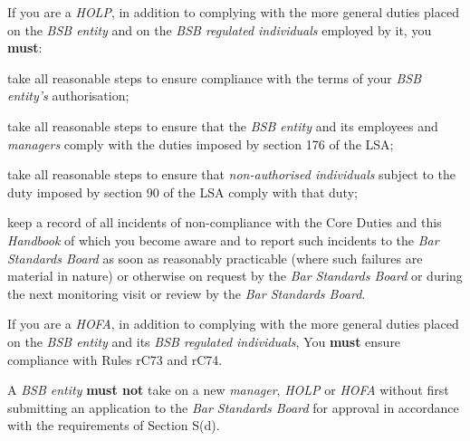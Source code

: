 


If you are a \emph{HOLP}, in addition to complying with the more general
duties placed on the \emph{BSB entity} and on the \emph{BSB regulated
individuals} employed by it, you \textcolor{myred}{\textbf{must}}:
\begin{numlist}
\item take all reasonable steps to ensure compliance with the terms of your
\emph{BSB entity's} authorisation;

\item take all reasonable steps to ensure that the \emph{BSB entity} and
its employees and \emph{managers} comply with the duties imposed by
section 176 of the LSA;

\item take all reasonable steps to ensure that \emph{non-authorised
individuals} subject to the duty imposed by section 90 of the LSA comply
with that duty;

\item keep a record of all incidents of non-compliance with the Core Duties
and this \emph{Handbook} of which you become aware and to report such
incidents to the \emph{Bar Standards Board} as soon as reasonably
practicable (where such failures are material in nature) or otherwise on
request by the \emph{Bar Standards Board} or during the next monitoring
visit or review by the \emph{Bar Standards Board}.
\end{numlist}

If you are a \emph{HOFA}, in addition to complying with the more general
duties placed on the \emph{BSB entity} and its \emph{BSB regulated
individuals}, You \textcolor{myred}{\textbf{must}} ensure compliance with Rules rC73 and rC74.




A \emph{BSB entity} \textcolor{myred}{\textbf{must not}} take on a new \emph{manager}, \emph{HOLP}
or \emph{HOFA} without first submitting an application to the \emph{Bar
Standards Board} for approval in accordance with the requirements of
Section S(d).



